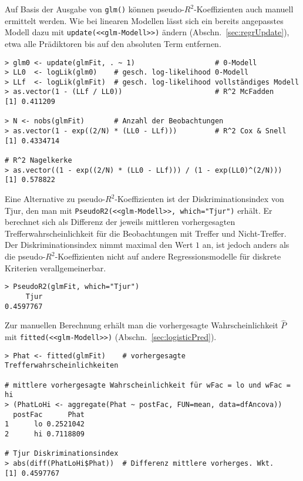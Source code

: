 Auf Basis der Ausgabe von \lstinline!glm()! können pseudo-$R^{2}$-Koeffizienten auch manuell ermittelt werden. Wie bei linearen Modellen lässt sich ein bereits angepasstes Modell dazu mit \lstinline!update(<<glm-Modell>>)! ändern (Abschn.\ \ref{sec:regrUpdate}), etwa alle Prädiktoren bis auf den absoluten Term entfernen.
\begin{lstlisting}
> glm0 <- update(glmFit, . ~ 1)                   # 0-Modell
> LL0  <- logLik(glm0)    # gesch. log-likelihood 0-Modell
> LLf  <- logLik(glmFit)  # gesch. log-likelihood vollständiges Modell
> as.vector(1 - (LLf / LL0))                      # R^2 McFadden
[1] 0.411209

> N <- nobs(glmFit)       # Anzahl der Beobachtungen
> as.vector(1 - exp((2/N) * (LL0 - LLf)))         # R^2 Cox & Snell
[1] 0.4334714

# R^2 Nagelkerke
> as.vector((1 - exp((2/N) * (LL0 - LLf))) / (1 - exp(LL0)^(2/N)))
[1] 0.578822
\end{lstlisting}

Eine Alternative zu pseudo-$R^{2}$-Koeffizienten ist der Diskriminationsindex von Tjur, den man mit \lstinline!PseudoR2(<<glm-Modell>>, which="Tjur")! erhält. Er berechnet sich als Differenz der jeweils mittleren vorhergesagten Trefferwahrscheinlichkeit für die Beobachtungen mit Treffer und Nicht-Treffer. Der Diskriminationsindex nimmt maximal den Wert $1$ an, ist jedoch anders als die pseudo-$R^{2}$-Koeffizienten nicht auf andere Regressionsmodelle für diskrete Kriterien verallgemeinerbar.
\begin{lstlisting}
> PseudoR2(glmFit, which="Tjur")
     Tjur
0.4597767
\end{lstlisting}

Zur manuellen Berechnung erhält man die vorhergesagte Wahrscheinlichkeit $\hat{P}$ mit  \lstinline!fitted(<<glm-Modell>>)! (Abschn.\ \ref{sec:logisticPred}).
\begin{lstlisting}
> Phat <- fitted(glmFit)    # vorhergesagte Trefferwahrscheinlichkeiten

# mittlere vorhergesagte Wahrscheinlichkeit für wFac = lo und wFac = hi
> (PhatLoHi <- aggregate(Phat ~ postFac, FUN=mean, data=dfAncova))
  postFac      Phat
1      lo 0.2521042
2      hi 0.7118809

# Tjur Diskriminationsindex
> abs(diff(PhatLoHi$Phat))  # Differenz mittlere vorherges. Wkt.
[1] 0.4597767
\end{lstlisting}

